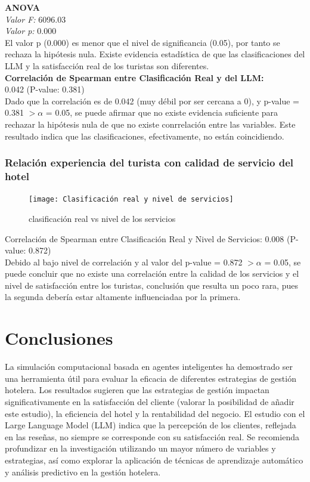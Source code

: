 \documentclass[12pt,a4paper]{article} \usepackage[spanish]{babel} \usepackage{graphicx} \usepackage{amsmath} \usepackage{amsfonts} \usepackage{amssymb} \usepackage{float} \usepackage{geometry}
\begin{document}
\textbf{ANOVA}\\
\textit{Valor F:} 6096.03\\
\textit{Valor p:} 0.000\\
El valor p (0.000) es menor que el nivel de significancia (0.05), por tanto se rechaza la hipótesis nula. Existe evidencia estadística de que las clasificaciones del LLM y la satisfacción real de los turistas son diferentes.\\

\textbf{Correlación de Spearman entre Clasificación Real y del LLM:}\\
 0.042 (P-value: 0.381)\\
 Dado que la correlación es de 0.042 (muy débil por ser cercana a 0), y p-value = 0.381 $> \alpha$ = 0.05, se puede afirmar que no existe evidencia suficiente para rechazar la hipótesis nula de que no existe conrrelación entre las variables. Este resultado indica que las clasificaciones, efectivamente, no están coincidiendo.

\subsubsection{Relación experiencia del turista con calidad de servicio del hotel} %
\begin{figure}[H] \centering \texttt{[image: Clasificación real y nivel de servicios]} \caption{clasificación real vs nivel de los servicios} \label{fig:etiqueta} \end{figure}
Correlación de Spearman entre Clasificación Real y Nivel de Servicios: 0.008 (P-value: 0.872)\\
Debido al bajo nivel de correlación y al valor del p-value = 0.872 $> \alpha$ = 0.05, se puede concluir que no existe una correlación entre la calidad de los servicios y el nivel de satisfacción entre los turistas, conclusión que resulta un poco rara, pues la segunda debería estar altamente influenciadaa por la primera.


\section{Conclusiones}

La simulación computacional basada en agentes inteligentes ha demostrado ser una herramienta útil para evaluar la eficacia de diferentes estrategias de gestión hotelera. Los resultados sugieren que las estrategias de gestión impactan significativamente en la satisfacción del cliente (valorar la posibilidad de añadir este estudio), la eficiencia del hotel y la rentabilidad del negocio. El estudio con el Large Language Model (LLM) indica que la percepción de los clientes, reflejada en las reseñas, no siempre se corresponde con su satisfacción real. Se recomienda profundizar en la investigación utilizando un mayor número de variables y estrategias, así como explorar la aplicación de técnicas de aprendizaje automático y análisis predictivo en la gestión hotelera.
\end{document}
